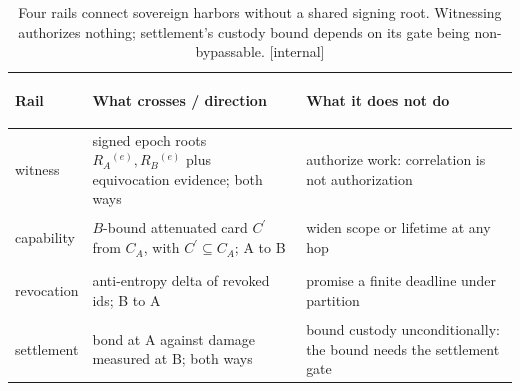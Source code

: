 \begin{table}[H]
\centering
\begin{minipage}{.96\linewidth}
\caption{Four rails connect sovereign harbors without a shared signing root. Witnessing authorizes nothing; settlement's custody bound depends on its gate being non-bypassable. [internal]}
\label{tab:fh-topology}
\small
\renewcommand{\arraystretch}{1.15}
\begin{tabularx}{\linewidth}{@{}>{\bfseries\raggedright\arraybackslash}p{1.55cm} >{\raggedright\arraybackslash}X >{\raggedright\arraybackslash}X@{}}
\toprule
Rail & \textbf{What crosses / direction} & \textbf{What it does not do} \\
\midrule
witness & signed epoch roots $R_A{}^{(e)},R_B{}^{(e)}$ plus equivocation evidence; both ways & authorize work: correlation is not authorization \\
capability & $B$-bound attenuated card $C^{\prime}$ from $C_A$, with $C^{\prime}\subseteq C_A$; A to B & widen scope or lifetime at any hop \\
revocation & anti-entropy delta of revoked ids; B to A & promise a finite deadline under partition \\
settlement & bond at A against damage measured at B; both ways & bound custody unconditionally: the bound needs the settlement gate \\
\bottomrule
\end{tabularx}
\end{minipage}
\end{table}

